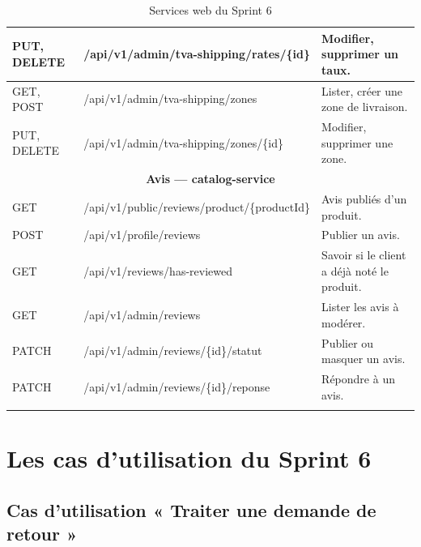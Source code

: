 \begin{longtable}{|p{1.5cm}|p{6.8cm}|p{6.2cm}|}
\hline
PUT, DELETE & /api/v1/admin/tva-shipping/rates/\{id\} & Modifier, supprimer un taux. \\
\hline
GET, POST & /api/v1/admin/tva-shipping/zones & Lister, créer une zone de livraison. \\
\hline
PUT, DELETE & /api/v1/admin/tva-shipping/zones/\{id\} & Modifier, supprimer une zone. \\
\hline
\multicolumn{3}{|c|}{\textbf{Avis --- catalog-service}} \\
\hline
GET & /api/v1/public/reviews/product/\{productId\} & Avis publiés d'un produit. \\
\hline
POST & /api/v1/profile/reviews & Publier un avis. \\
\hline
GET & /api/v1/reviews/has-reviewed & Savoir si le client a déjà noté le produit. \\
\hline
GET & /api/v1/admin/reviews & Lister les avis à modérer. \\
\hline
PATCH & /api/v1/admin/reviews/\{id\}/statut & Publier ou masquer un avis. \\
\hline
PATCH & /api/v1/admin/reviews/\{id\}/reponse & Répondre à un avis. \\
\hline
\caption{Services web du Sprint 6}
\label{tab:ws-sprint6}
\end{longtable}

\section{Les cas d'utilisation du Sprint 6}
\subsection{Cas d'utilisation « Traiter une demande de retour »}
